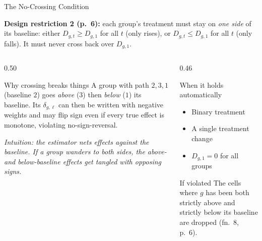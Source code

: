 \documentclass[main.tex]{subfiles}
\begin{document}
\begin{frame}{The No-Crossing Condition}

  \textbf{Design restriction 2 (p.~6):} each group's treatment must stay on \emph{one
  side} of its baseline: either $D_{g,t}\geq D_{g,1}$ for all $t$
  (only rises), or $D_{g,t}\leq D_{g,1}$ for all $t$ (only falls).
  It must never cross back over $D_{g,1}$.

  \medskip
  \begin{columns}[T]
    \begin{column}{0.50\textwidth}
      \begin{alertblock}{Why crossing breaks things}
        \footnotesize
        A group with path $2,3,1$ (baseline $2$) goes \emph{above}
        ($3$) then \emph{below} ($1$) its baseline. Its $\delta_{g,\ell}$
        can then be written with \alert{negative weights} and may flip
        sign even if every true effect is monotone, violating
        no-sign-reversal.
      \end{alertblock}

      \smallskip
      \textit{\footnotesize Intuition: the estimator nets effects
      against the baseline. If a group wanders to both sides, the
      above- and below-baseline effects get tangled with opposing
      signs.}
    \end{column}
    \begin{column}{0.46\textwidth}
      \begin{block}{When it holds automatically}
        \footnotesize
        \begin{itemize}\footnotesize
          \item Binary treatment
          \item A single treatment change
          \item $D_{g,1}=0$ for all groups
        \end{itemize}
      \end{block}

      \smallskip
      \begin{block}{\footnotesize If violated}
        \footnotesize
        The cells where $g$ has been both strictly above and strictly below
        its baseline are dropped (fn.~8, p.~6).
      \end{block}
    \end{column}
  \end{columns}

\end{frame}
\end{document}
